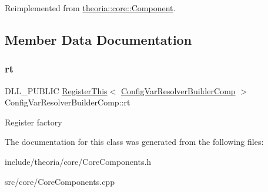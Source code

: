 Reimplemented from \hyperlink{classtheoria_1_1core_1_1Component_a7ed45f6e38442a40666ae4556f794f7d}{theoria\+::core\+::\+Component}.



\subsection{Member Data Documentation}
\mbox{\label{classtheoria_1_1core_1_1ConfigVarResolverBuilderComp_ac80fd840a9280e471707d18c29557d9e}} 
\subsubsection{\texorpdfstring{rt}{rt}}
{\footnotesize\ttfamily D\+L\+L\+\_\+\+P\+U\+B\+L\+IC \hyperlink{classtheoria_1_1core_1_1RegisterThis}{Register\+This}$<$ \hyperlink{classtheoria_1_1core_1_1ConfigVarResolverBuilderComp}{Config\+Var\+Resolver\+Builder\+Comp} $>$ Config\+Var\+Resolver\+Builder\+Comp\+::rt\hspace{0.3cm}{\ttfamily [static]}}

Register factory 

The documentation for this class was generated from the following files\+:\begin{DoxyCompactItemize}
\item 
include/theoria/core/Core\+Components.\+h\item 
src/core/Core\+Components.\+cpp\end{DoxyCompactItemize}
